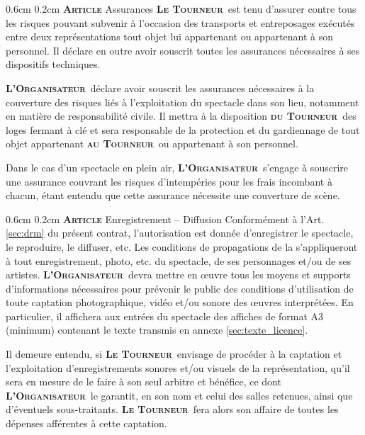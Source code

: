 \documentclass[a4paper,10pt]{article}
\makeatletter
\newcommand{\PR}{\textbf{\textsc{Le Tourneur}}}
\newcommand{\duPR}{\textbf{\textsc{du Tourneur}}}
\newcommand{\auPR}{\textbf{\textsc{au Tourneur}}}
\newcommand{\OR}{\textbf{\textsc{L'Organisateur}}}
\renewcommand\section{\@startsection{section}{1}{\z@}%
	{0.6cm}%
	{0.2cm}%
	{\noindent\large\bfseries\scshape Article }}
\makeatother
\begin{document}
\section{Assurances}
\label{sec:assurances}
\PR\ est tenu d'assurer contre tous les risques pouvant subvenir \`a
l'occasion des transports et entreposages ex\'ecut\'es entre deux
repr\'esentations tout objet lui appartenant ou appartenant \`a son
personnel. Il d\'eclare en outre avoir souscrit toutes les assurances
n\'ecessaires \`a ses dispositifs techniques.

\OR\ d\'eclare avoir souscrit les assurances n\'ecessaires \`a la couverture
des risques li\'es \`a l'exploitation du spectacle dans son lieu,
notamment en mati\`ere de responsabilit\'e civile. Il mettra \`a la
disposition \duPR\ des loges fermant \`a cl\'e et sera responsable de la
protection et du gardiennage de tout objet appartenant \auPR\ ou
appartenant \`a son personnel.

Dans le cas d'un spectacle en plein air, \OR\ s'engage \`a souscrire une
assurance couvrant les risques d'intemp\'eries pour les frais incombant
\`a chacun, \'etant entendu que cette assurance n\'ecessite une couverture
de sc\`ene.

\section{Enregistrement -- Diffusion}
\label{sec:enregistrement}
Conform\'ement \`a l'Art. \ref{sec:drm} du pr\'esent contrat, l'autorisation
est donn\'ee d'enregistrer le spectacle, le reproduire, le diffuser,
etc. Les conditions de propagations de la \LICENCETYPE{} s'appliqueront
\`a tout enregistrement, photo, etc. du spectacle, de ses personnages
et/ou de ses artistes. \OR\ devra mettre en \oe uvre tous les moyens et
supports d'informations n\'ecessaires pour pr\'evenir le public des
conditions d'utilisation de toute captation photographique, vid\'eo
et/ou sonore des \oe uvres interpr\'et\'ees. En particulier, il affichera
aux entr\'ees du spectacle des affiches de format A3 (minimum) contenant
le texte transmis en annexe \ref{sec:texte_licence}.

Il demeure entendu, si \PR\ envisage de proc\'eder \`a la captation et
l'exploitation d'enregistrements sonores et/ou visuels de la
repr\'esentation, qu'il sera en mesure de le faire \`a son seul arbitre et
b\'en\'efice, ce dont \OR\ le garantit, en son nom et celui des salles
retenues, ainsi que d'\'eventuels sous-traitants. \PR\ fera alors son
affaire de toutes les d\'epenses aff\'erentes \`a cette captation.
\end{document}
